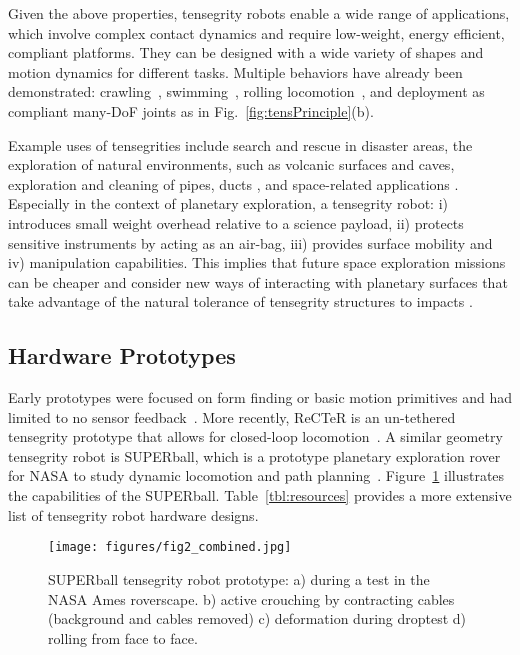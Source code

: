 Given the above properties, tensegrity robots enable a wide range of
applications, which involve complex contact dynamics and require
low-weight, energy efficient, compliant platforms.  They can be
designed with a wide variety of shapes and motion dynamics for
different tasks. Multiple behaviors have already been demonstrated:
crawling~\cite{Paul2006a,MirletzSoftRobotics},
swimming~\cite{Bliss2013Central-Pattern}, rolling
locomotion~\cite{iscen2014flop, kimrobust}, and deployment as
compliant many-DoF joints as in Fig.~\ref{fig:tensPrinciple}(b).

Example uses of tensegrities include search and rescue in disaster
areas, the exploration of natural environments, such as volcanic
surfaces and caves, exploration and cleaning of pipes,
ducts \cite{6907473}, and space-related
applications \cite{Furuya:1992dq}.  Especially in the context of
planetary exploration, a tensegrity robot: i) introduces small weight
overhead relative to a science payload, ii) protects sensitive
instruments by acting as an air-bag, iii) provides surface mobility
and iv) manipulation capabilities.  This implies that future space
exploration missions can be cheaper and consider new ways of
interacting with planetary surfaces that take advantage of the natural
tolerance of tensegrity structures to
impacts \cite{SunSpiral2013Tensegrity-Base}.

\subsection{Hardware Prototypes}

Early prototypes were focused on form finding or basic motion
primitives and had limited to no sensor feedback~\cite{Paul2006a,
Rovira2009Control-and-Sim, miratstur2011athree-dof, Shibata2009,
bohm2013vibration}.  More recently, ReCTeR is an un-tethered
tensegrity prototype that allows for closed-loop
locomotion~\cite{Caluwaerts2013rsif}.  A similar geometry tensegrity
robot is SUPERball, which is a prototype planetary exploration rover
for NASA to study dynamic locomotion and path
planning~\cite{bruce2014design,sabelhaus2015system}.
Figure~\ref{fig:SB} illustrates the capabilities of the SUPERball.
Table~\ref{tbl:resources} provides a more extensive list of tensegrity
robot hardware designs.

\begin{figure}[th]
\vspace{-.1in}
\centering
\texttt{[image: figures/fig2\_combined.jpg]}
\vspace{-.3in}
\caption{SUPERball tensegrity robot prototype: a) during a test
      in the NASA Ames roverscape. b) active crouching by contracting
      cables (background and cables removed) c) deformation during
      droptest d) rolling from face to
      face.}  
\vspace{-.2in}
\label{fig:SB}
\end{figure}


